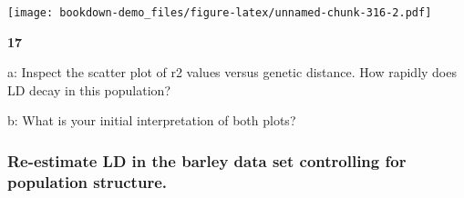 \documentclass[
]{book}
\makeatletter
\newenvironment{kframe}{%
\medskip{}
\setlength{\fboxsep}{.8em}
 \def\at@end@of@kframe{}%
 \ifinner\ifhmode%
  \def\at@end@of@kframe{\end{minipage}}%
  \begin{minipage}{\columnwidth}%
 \fi\fi%
 \def\FrameCommand##1{\hskip\@totalleftmargin \hskip-\fboxsep
 \colorbox{shadecolor}{##1}\hskip-\fboxsep
     \hskip-\linewidth \hskip-\@totalleftmargin \hskip\columnwidth}%
 \MakeFramed {\advance\hsize-\width
   \@totalleftmargin\z@ \linewidth\hsize
   \@setminipage}}%
 {\par\unskip\endMakeFramed%
 \at@end@of@kframe}
\newenvironment{rmdblock}[1]
  {
  \begin{itemize}
  \renewcommand{\labelitemi}{
    \raisebox{-.7\height}[0pt][0pt]{
      {\setkeys{Gin}{width=3em,keepaspectratio}\texttt{[image: images/\#1]}}
    }
  }
  \setlength{\fboxsep}{1em}
  \begin{kframe}
  \item
  }
  {
  \end{kframe}
  \end{itemize}
  }
\newenvironment{rmdquiz}
  {\begin{rmdblock}{quiz}}
  {\end{rmdblock}}
\makeatother
\begin{document}
\texttt{[image: bookdown-demo\_files/figure-latex/unnamed-chunk-316-2.pdf]}

\begin{rmdquiz}
\textbf{17}

a: Inspect the scatter plot of r2 values versus genetic distance. How rapidly does LD decay in this population?

b: What is your initial interpretation of both plots?
\end{rmdquiz}

\hypertarget{re-estimate-ld-in-the-barley-data-set-controlling-for-population-structure.}{%
\subsubsection{Re-estimate LD in the barley data set controlling for population structure.}\label{re-estimate-ld-in-the-barley-data-set-controlling-for-population-structure.}}
\end{document}
